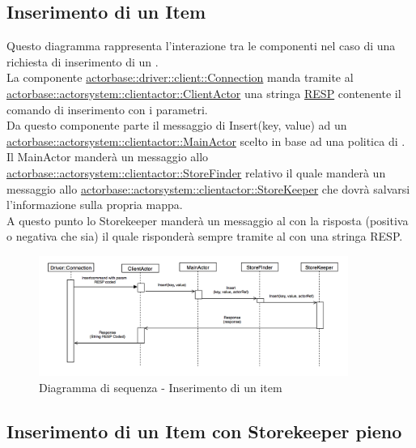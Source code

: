 \documentclass{scalatekids-article}
\begin{document}
\subsection{Inserimento di un Item}

Questo diagramma rappresenta l'interazione tra le componenti nel caso di una richiesta di inserimento di un .\\
La componente \hyperref[sec:actorbase::driver::client::Connection]{actorbase::driver::client::Connection}
manda tramite  al \hyperref[sec:actorbase::actorsystem::clientactor::ClientActor]{actorbase::actorsystem::clientactor::ClientActor}
una stringa \hyperref[sec:RESP]{RESP} contenente il comando di inserimento  con
i parametri.\\
Da questo componente parte il messaggio di Insert(key, value) ad un \hyperref[sec:actorbase::actorsystem::clientactor::MainActor]{actorbase::actorsystem::clientactor::MainActor} scelto in base ad una
politica di . Il MainActor manderà un messaggio allo \hyperref[sec:actorbase::actorsystem::clientactor::StoreFinder]{actorbase::actorsystem::clientactor::StoreFinder} relativo il quale manderà un messaggio allo \hyperref[sec:actorbase::actorsystem::clientactor::StoreKeeper]{actorbase::actorsystem::clientactor::StoreKeeper} che dovrà salvarsi l'informazione
sulla propria mappa.\\
A questo punto lo Storekeeper manderà un messaggio al  con la risposta
(positiva o negativa che sia) il quale risponderà sempre tramite  al  con una stringa RESP.
\begin{figure}[H]
  \begin{center}
    \includegraphics[width=0.9\textwidth, keepaspectratio]{img/diagrammiSequenza/esempioInsert.png}
    \caption{Diagramma di sequenza - Inserimento di un item}
  \end{center}
\end{figure}

\subsection{Inserimento di un Item con Storekeeper pieno}
\end{document}
